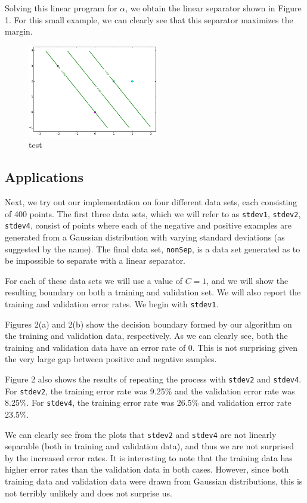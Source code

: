 \documentclass{sigchi}
\begin{document}
\large
Solving this linear program for $\alpha$, we obtain the linear separator shown in Figure 1. For this small example, we can clearly see that this separator maximizes the margin.

\begin{figure}
\centering
\includegraphics[width=2.25in]{plots/1-1.png}
\caption{test}
\end{figure}

\subsection{Applications}

Next, we try out our implementation on four different data sets, each consisting of 400 points. The first three data sets, which we will refer to as \texttt{stdev1}, \texttt{stdev2}, \texttt{stdev4}, consist of points where each of the negative and positive examples are generated from a Gaussian distribution with varying standard deviations (as suggested by the name). The final data set, \texttt{nonSep}, is a data set generated as to be impossible to separate with a linear separator.

For each of these data sets we will use a value of $C = 1$, and we will show the resulting boundary on both a training and validation set. We will also report the training and validation error rates. We begin with \texttt{stdev1}.

Figures 2(a) and 2(b) show the decision boundary formed by our algorithm on the training and validation data, respectively. As we can clearly see, both the training and validation data have an error rate of 0. This is not surprising given the very large gap between positive and negative samples.

Figure 2 also shows the results of repeating the process with \texttt{stdev2} and \texttt{stdev4}. For \texttt{stdev2}, the training error rate was 9.25\% and the validation error rate was 8.25\%. For \texttt{stdev4}, the training error rate was 26.5\% and validation error rate 23.5\%.

We can clearly see from the plots that \texttt{stdev2} and \texttt{stdev4} are not linearly separable (both in training and validation data), and thus we are not surprised by the increased error rates. It is interesting to note that the training data has higher error rates than the validation data in both cases. However, since both training data and validation data were drawn from Gaussian distributions, this is not terribly unlikely and does not surprise us.
\end{document}
